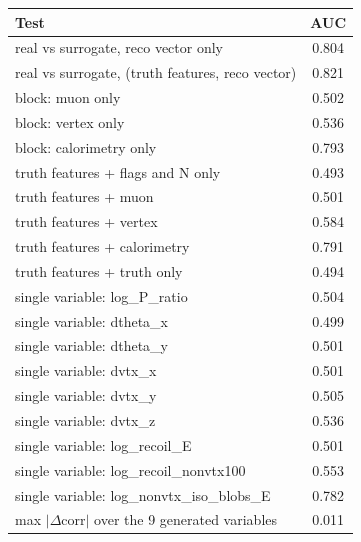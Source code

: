 \begin{tabular}{lc}
\toprule
Test & AUC \\
\midrule
real vs surrogate, reco vector only & 0.804 \\
real vs surrogate, (truth features, reco vector) & 0.821 \\
\midrule
block: muon only & 0.502 \\
block: vertex only & 0.536 \\
block: calorimetry only & 0.793 \\
truth features + flags and N only & 0.493 \\
truth features + muon & 0.501 \\
truth features + vertex & 0.584 \\
truth features + calorimetry & 0.791 \\
truth features + truth only & 0.494 \\
single variable: log\_P\_ratio & 0.504 \\
single variable: dtheta\_x & 0.499 \\
single variable: dtheta\_y & 0.501 \\
single variable: dvtx\_x & 0.501 \\
single variable: dvtx\_y & 0.505 \\
single variable: dvtx\_z & 0.536 \\
single variable: log\_recoil\_E & 0.501 \\
single variable: log\_recoil\_nonvtx100 & 0.553 \\
single variable: log\_nonvtx\_iso\_blobs\_E & 0.782 \\
\midrule
max $|\Delta$corr$|$ over the 9 generated variables & 0.011 \\
\bottomrule
\end{tabular}
